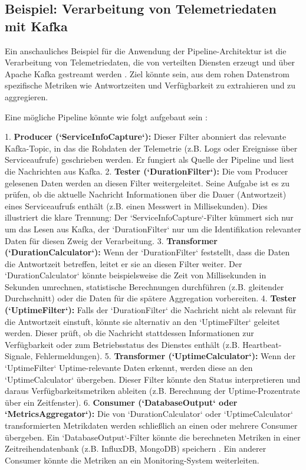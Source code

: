 \documentclass[11pt, a4paper]{article}
\begin{document}
\subsection{Beispiel: Verarbeitung von Telemetriedaten mit Kafka}

Ein anschauliches Beispiel für die Anwendung der Pipeline-Architektur ist die Verarbeitung von Telemetriedaten, die von verteilten Diensten erzeugt und über Apache Kafka gestreamt werden \cite{RichardsFord2020}. Ziel könnte sein, aus dem rohen Datenstrom spezifische Metriken wie Antwortzeiten und Verfügbarkeit zu extrahieren und zu aggregieren.

Eine mögliche Pipeline könnte wie folgt aufgebaut sein \cite{RichardsFord2020}:

1.  \textbf{Producer (`ServiceInfoCapture`):} Dieser Filter abonniert das relevante Kafka-Topic, in das die Rohdaten der Telemetrie (z.B. Logs oder Ereignisse über Serviceaufrufe) geschrieben werden. Er fungiert als Quelle der Pipeline und liest die Nachrichten aus Kafka.
2.  \textbf{Tester (`DurationFilter`):} Die vom Producer gelesenen Daten werden an diesen Filter weitergeleitet. Seine Aufgabe ist es zu prüfen, ob die aktuelle Nachricht Informationen über die Dauer (Antwortzeit) eines Serviceaufrufs enthält (z.B. einen Messwert in Millisekunden). Dies illustriert die klare Trennung: Der `ServiceInfoCapture`-Filter kümmert sich nur um das Lesen aus Kafka, der `DurationFilter` nur um die Identifikation relevanter Daten für diesen Zweig der Verarbeitung.
3.  \textbf{Transformer (`DurationCalculator`):} Wenn der `DurationFilter` feststellt, dass die Daten die Antwortzeit betreffen, leitet er sie an diesen Filter weiter. Der `DurationCalculator` könnte beispielsweise die Zeit von Millisekunden in Sekunden umrechnen, statistische Berechnungen durchführen (z.B. gleitender Durchschnitt) oder die Daten für die spätere Aggregation vorbereiten.
4.  \textbf{Tester (`UptimeFilter`):} Falls der `DurationFilter` die Nachricht nicht als relevant für die Antwortzeit einstuft, könnte sie alternativ an den `UptimeFilter` geleitet werden. Dieser prüft, ob die Nachricht stattdessen Informationen zur Verfügbarkeit oder zum Betriebsstatus des Dienstes enthält (z.B. Heartbeat-Signale, Fehlermeldungen).
5.  \textbf{Transformer (`UptimeCalculator`):} Wenn der `UptimeFilter` Uptime-relevante Daten erkennt, werden diese an den `UptimeCalculator` übergeben. Dieser Filter könnte den Status interpretieren und daraus Verfügbarkeitsmetriken ableiten (z.B. Berechnung der Uptime-Prozentrate über ein Zeitfenster).
6.  \textbf{Consumer (`DatabaseOutput` oder `MetricsAggregator`):} Die von `DurationCalculator` oder `UptimeCalculator` transformierten Metrikdaten werden schließlich an einen oder mehrere Consumer übergeben. Ein `DatabaseOutput`-Filter könnte die berechneten Metriken in einer Zeitreihendatenbank (z.B. InfluxDB, MongoDB) speichern \cite{RichardsFord2020}. Ein anderer Consumer könnte die Metriken an ein Monitoring-System weiterleiten.
\end{document}
